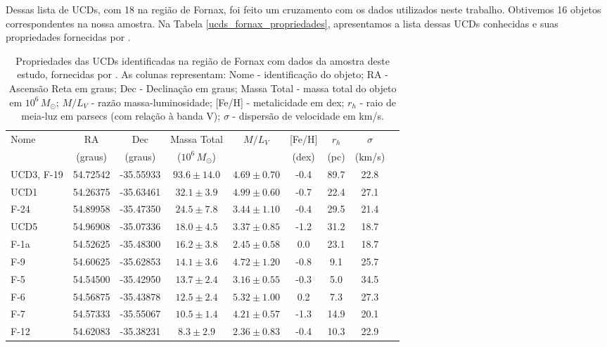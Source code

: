 Dessas lista de UCDs, com 18 na região de Fornax, foi feito um cruzamento com os dados utilizados neste trabalho. Obtivemos 16 objetos correspondentes na nossa amostra. Na Tabela \ref{ucds_fornax_propriedades}, apresentamos a lista dessas UCDs conhecidas e suas propriedades fornecidas por \citealt{Mieske_2008_2}.

\begin{table}[!ht]
    \centering
    \caption{Propriedades das UCDs identificadas na região de Fornax com dados da amostra deste estudo, fornecidas por \citealt{Mieske_2008_2}. As colunas representam: Nome - identificação do objeto; RA - Ascensão Reta em graus; Dec - Declinação em graus; Massa Total - massa total do objeto em $10^6 \, M_\odot$; $M/L_V$ - razão massa-luminosidade; [Fe/H] - metalicidade em dex; $r_h$ - raio de meia-luz em parsecs (com relação à banda V); $\sigma$ - dispersão de velocidade em km/s.}
    \begin{tabular}{lcccccccc}
        \toprule
        Nome & RA & Dec & Massa Total & $M/L_V$ & [Fe/H] & $r_h$ & $\sigma$ \\
        & (graus) & (graus) & ($10^6 \, M_\odot$) & & (dex) & (pc) & (km/s)\\
        \midrule
        UCD3, F-19 & 54.72542 & -35.55933 & $93.6 \pm 14.0$ & $4.69 \pm 0.70$ & -0.4 & 89.7 & 22.8 \\
        UCD1       & 54.26375 & -35.63461 & $32.1 \pm 3.9$  & $4.99 \pm 0.60$ & -0.7 & 22.4 & 27.1 \\
        F-24       & 54.89958 & -35.47350 & $24.5 \pm 7.8$  & $3.44 \pm 1.10$ & -0.4 & 29.5 & 21.4 \\
        UCD5       & 54.96908 & -35.07336 & $18.0 \pm 4.5$  & $3.37 \pm 0.85$ & -1.2 & 31.2 & 18.7 \\
        F-1a       & 54.52625 & -35.48300 & $16.2 \pm 3.8$  & $2.45 \pm 0.58$ & 0.0  & 23.1 & 18.7 \\
        F-9        & 54.60625 & -35.62853 & $14.1 \pm 3.6$  & $4.72 \pm 1.20$ & -0.8 & 9.1  & 25.7 \\
        F-5        & 54.54500 & -35.42950 & $13.7 \pm 2.4$  & $3.16 \pm 0.55$ & -0.3 & 5.0  & 34.5 \\
        F-6        & 54.56875 & -35.43878 & $12.5 \pm 2.4$  & $5.32 \pm 1.00$ & 0.2  & 7.3  & 27.3 \\
        F-7        & 54.57333 & -35.55067 & $10.5 \pm 1.4$  & $4.21 \pm 0.57$ & -1.3 & 14.9 & 20.1 \\
        F-12       & 54.62083 & -35.38231 & $8.3 \pm 2.9$   & $2.36 \pm 0.83$ & -0.4 & 10.3 & 22.9 \\

\end{tabular}
\end{table}
